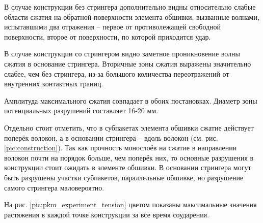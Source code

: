 В случае конструкции без стрингера дополнительно видны относительно слабые области сжатия на обратной поверхности элемента обшивки, вызванные волнами, испытавшими два отражения -- первое от противолежащей свободной поверхности, второе от поверхности, по которой приходится удар.

В случае конструкции со стрингером видно заметное проникновение волны сжатия в основание стрингера. Вторичные зоны сжатия выражены значительно слабее, чем без стрингера, из-за большого количества переотражений от внутренних контактных границ.

Амплитуда максимального сжатия совпадает в обоих постановках. Диаметр зоны потенциальных разрушений составляет 16-20 мм.

Отдельно стоит отметить, что в субпакетах элемента обшивки сжатие действует поперёк волокон, а в основании стрингера -- вдоль волокон (см. рис. \ref{pic:construction}). Так как прочность монослоёв на сжатие в направлении волокон почти на порядок больше, чем поперёк них, то основные разрушения в конструкции стоит ожидать в элементе обшивки. В основании стрингера могут быть разрушены участки субпакетов, параллельные обшивке, но разрушение самого стрингера маловероятно.


\clearpage
\newpage

На рис. \ref{pic:pkm_experiment_tension} цветом показаны максимальные значения растяжения в каждой точке конструкции за все время соударения.

